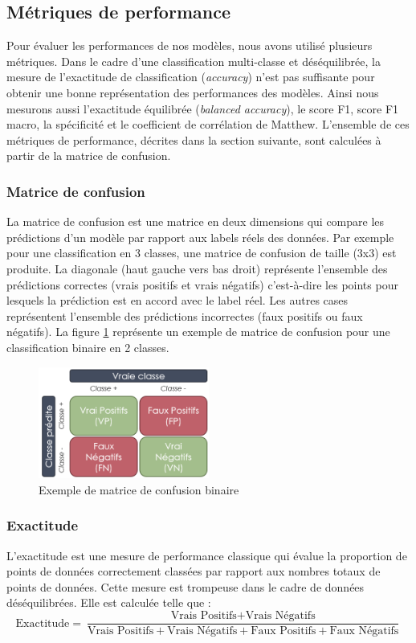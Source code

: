\subsection{Métriques de performance}
Pour évaluer les performances de nos modèles, nous avons utilisé plusieurs métriques. Dans le cadre d'une classification multi-classe et déséquilibrée, la mesure de l'exactitude de classification (\textit{accuracy}) n'est pas suffisante pour obtenir une bonne représentation des performances des modèles. Ainsi nous mesurons aussi l'exactitude équilibrée (\textit{balanced accuracy}), le score F1, score F1 macro, la spécificité et le coefficient de corrélation de Matthew. L'ensemble de ces métriques de performance, décrites dans la section suivante, sont calculées à partir de la matrice de confusion.

\subsubsection{Matrice de confusion}
La matrice de confusion est une matrice en deux dimensions qui compare  les prédictions d'un modèle par rapport aux labels réels des données. Par exemple pour une classification en 3 classes, une matrice de confusion de taille (3x3) est produite. La diagonale (haut gauche vers bas droit) représente l'ensemble des prédictions correctes (vrais positifs et vrais négatifs) c'est-à-dire les points pour lesquels la prédiction est en accord avec le label réel. Les autres cases représentent l'ensemble des prédictions incorrectes (faux positifs ou faux négatifs). La figure \ref{fig:confusion-example}  représente un exemple de matrice de confusion pour une classification binaire en 2 classes.
\begin{figure}[!ht]
 \centering
 \includegraphics[width=0.5\textwidth]{figures/confusion_example.png}
 \caption[Exemple de matrice de confusion binaire]{Exemple de matrice de confusion binaire}
 \label{fig:confusion-example}
\end{figure}

\subsubsection{Exactitude}
L'exactitude est une mesure de performance classique qui évalue la proportion de points de données correctement classées par rapport aux nombres totaux de points de données. Cette mesure est trompeuse dans le cadre de données déséquilibrées. Elle est calculée telle que :
\[ \text{Exactitude} = \frac{\text{Vrais Positifs} + \text{Vrais Négatifs}}{\text{Vrais Positifs} + \text{Vrais Négatifs} + \text{Faux Positifs} + \text{Faux Négatifs}} \]

